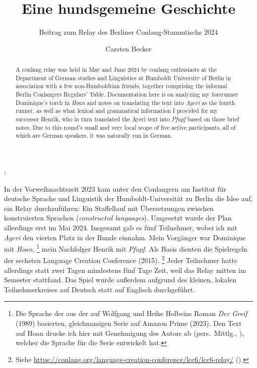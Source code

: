 \documentclass[
	12pt,
	ngerman,
]{scrartcl}
\author{Carsten Becker}
\title{Eine hundsgemeine Geschichte}
\subtitle{Beitrag zum Relay des Berliner Conlang-Stammtischs 2024}
\date{\DTMdate{2024-06-08}} %
\let\q\textquote
\newcommand{\fw}[1]{\textit{#1}} %
\newcommand{\tit}[1]{\textit{#1}} %
\newenvironment{mytitle}{
	\hfill
	\begin{minipage}{0.667\textwidth}
	\vspace{\baselineskip}
	\begin{center}
		\Large
		\sffamily\bfseries
		\makeatletter
}{
		\makeatother
	\end{center}
	\vspace{1em}
	\end{minipage}
	\hfill
}
\begin{document}

\begin{mytitle}
	\@title: \@subtitle
\end{mytitle}

\begin{abstract}
A conlang relay was held in May and June 2024 by conlang enthusiasts at the
Department of German studies and Linguistics at Humboldt University of Berlin
in association with a few non-Humboldtian friends, together comprising the
informal Berlin Conlangers Regulars' Table. Documentation here is on analyzing
my forerunner Dominique's torch in \tit{Hoan} and notes on translating the text
into \tit{Ayeri} as the fourth runner, as well as what lexical and grammatical
information I provided for my successor Henrik, who in turn translated the
Ayeri text into \tit{Pfupf} based on those brief notes. Due to this round's
small and very local scope of five active participants, all of which are German
speakers, it was naturally run in German.
\end{abstract}

In der Vorweihnachtszeit 2023 kam unter den Conlangern am Institut für deutsche
Sprache und Linguistik der Humboldt-Universität zu Berlin die Idee auf, ein
Relay durchzuführen: Ein Staffellauf mit Übersetzungen zwischen konstruierten
Sprachen (\fw{constructed languages}). Umgesetzt wurde der Plan allerdings erst
im Mai 2024. Insgesamt gab es fünf Teilnehmer, wobei ich mit \tit{Ayeri} den
vierten Platz in der Runde einnahm. Mein Vorgänger war Dominique mit
\tit{Hoan},%
%
	\footnote{Die Sprache der \q{Gehörnten} aus der auf Wolfgang und Heike
	Holbeins Roman \tit{Der Greif} (1989) basierten, gleichnamigen Serie auf
	Amazon Prime (2023). Den Text auf Hoan drucke ich hier mit Genehmigung des
	Autors ab (pers.~Mittlg., ), welcher die Sprache für
	die Serie entwickelt hat.}
%
mein Nachfolger Henrik mit \tit{Pfupf}. Als Basis dienten die Spielregeln der
sechsten Language Creation Conference (2015).%
%
	\footnote{Siehe
	\url{https://conlang.org/language-creation-conference/lcc6/lcc6-relay/}
	().}
%
Jeder Teilnehmer hatte allerdings statt zwei Tagen mindestens fünf Tage Zeit,
weil das Relay mitten im Semester stattfand. Das Spiel wurde außerdem aufgrund
des kleinen, lokalen Teilnehmerkreises auf Deutsch statt auf Englisch
durchgeführt.

\end{document}
